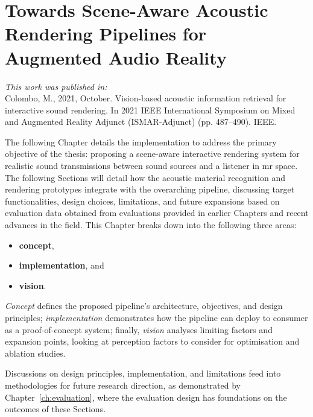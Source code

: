 \chapter{Towards Scene-Aware Acoustic Rendering Pipelines for Augmented Audio Reality}\label{ch:ar-pipeline}

\textit{This work was published in:}\\

Colombo, M., 2021, October. Vision-based acoustic information retrieval for interactive sound rendering. In 2021 IEEE International Symposium on Mixed and Augmented Reality Adjunct (ISMAR-Adjunct) (pp. 487--490). IEEE.
\bigskip

The following Chapter details the implementation to address the primary objective of the thesis: proposing a scene-aware interactive rendering system for realistic sound transmissions between sound sources and a listener in \acrshort{mr} space. The following Sections will detail how the acoustic material recognition and rendering prototypes integrate with the overarching pipeline, discussing target functionalities, design choices, limitations, and future expansions based on evaluation data obtained from evaluations provided in earlier Chapters and recent advances in the field. This Chapter breaks down into the following three areas:
\begin{itemize}
    \item \textbf{concept},
    \item \textbf{implementation}, and
    \item \textbf{vision}.
\end{itemize}
\emph{Concept} defines the proposed pipeline's architecture, objectives, and design principles; \emph{implementation} demonstrates how the pipeline can deploy to consumer  as a proof-of-concept system; finally, \emph{vision} analyses limiting factors and expansion points, looking at perception factors to consider for optimisation and ablation studies.\par
Discussions on design principles, implementation, and limitations feed into methodologies for future research direction, as demonstrated by Chapter~\ref{ch:evaluation}, where the evaluation design has foundations on the outcomes of these Sections.

